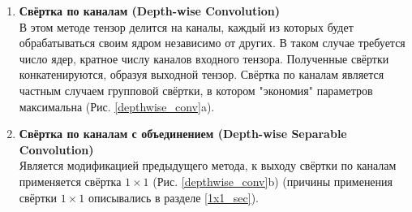 \documentclass[12pt, fleqn]{article}
\begin{document}
\begin{enumerate}
        \item \textbf{Свёртка по каналам (Depth-wise Convolution)}\\
        В этом методе тензор делится на каналы, каждый из которых будет 
        обрабатываться своим ядром независимо от других. В таком случае требуется число
        ядер, кратное числу каналов входного тензора. Полученные свёртки конкатенируются, 
        образуя выходной тензор. Свёртка по каналам 
        является частным случаем групповой свёртки, в котором "экономия" 
        параметров максимальна (Рис. \ref{depthwise_conv}a).
            
        \item \textbf{Свёртка по каналам с объединением (Depth-wise Separable Convolution)}\\
        Является модификацией предыдущего метода, к выходу свёртки по каналам
        применяется свёртка $1 \times 1$ (Рис. \ref{depthwise_conv}b) 
        (причины применения свёртки $1 \times 1$ описывались в разделе \ref{1x1_sec}). 


\end{enumerate}
\end{document}
